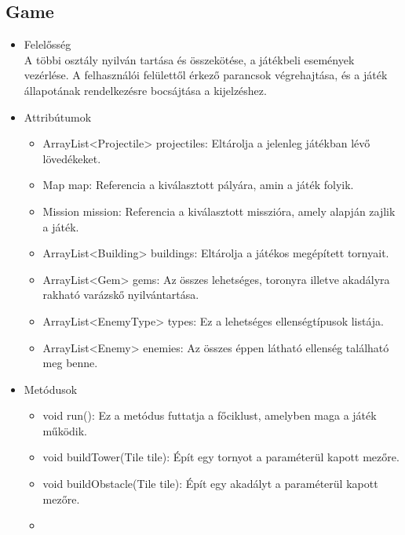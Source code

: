 \subsection{Game}
\begin{itemize}
\item Felelősség\\
A többi osztály nyilván tartása és összekötése, a játékbeli események vezérlése. A felhasználói felülettől érkező parancsok végrehajtása, és a játék állapotának rendelkezésre bocsájtása a kijelzéshez.

\item Attribútumok\\
	\begin{itemize}
		\item ArrayList<Projectile> projectiles: Eltárolja a jelenleg játékban lévő lövedékeket.
		\item Map map: Referencia a kiválasztott pályára, amin a játék folyik.
		\item Mission mission: Referencia a kiválasztott misszióra, amely alapján zajlik a játék.
		\item ArrayList<Building> buildings: Eltárolja a játékos megépített tornyait.
		\item ArrayList<Gem> gems: Az összes lehetséges, toronyra illetve akadályra rakható varázskő nyilvántartása.
		\item ArrayList<EnemyType> types: Ez a lehetséges ellenségtípusok listája.
		\item ArrayList<Enemy> enemies: Az összes éppen látható ellenség található meg benne.
	\end{itemize}
\item Metódusok\\
	\begin{itemize}
		\item void run(): Ez a metódus futtatja a főciklust, amelyben maga a játék működik.
		\item void buildTower(Tile tile): Épít egy tornyot a paraméterül kapott mezőre. 
		\item void buildObstacle(Tile tile): Épít egy akadályt a paraméterül kapott mezőre. 
		\item {}
	\end{itemize}
\end{itemize}

